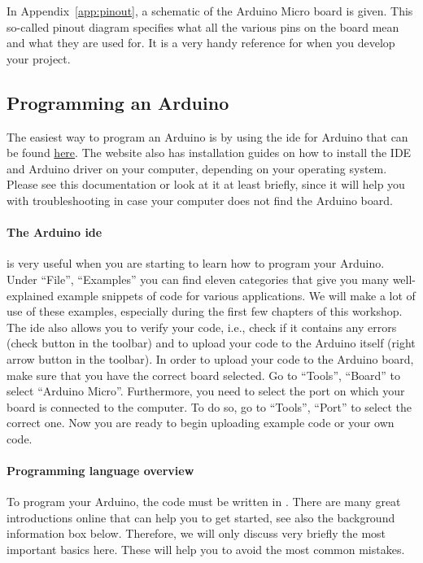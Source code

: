 In Appendix~\ref{app:pinout}, a schematic of the Arduino Micro board is given. This so-called pinout diagram specifies what all the various pins on the board mean and what they are used for. It is a very handy reference for when you develop your project.

\subsection{Programming an Arduino}

The easiest way to program an Arduino is by using the \ac{ide} for Arduino that can be found \href{https://www.arduino.cc/en/software}{here}. The website also has installation guides on how to install the IDE and Arduino driver on your computer, depending on your operating system. Please see this documentation or look at it at least briefly, since it will help you with troubleshooting in case your computer does not find the Arduino board.

\paragraph{The Arduino \ac{ide}} is very useful when you are starting to learn how to program your Arduino. Under ``File'', ``Examples'' you can find eleven categories that give you many well-explained example snippets of code for various applications. We will make a lot of use of these examples, especially during the first few chapters of this workshop. The \ac{ide} also allows you to verify your code, i.e., check if it contains any errors (check button in the toolbar) and to upload your code to the Arduino itself (right arrow button in the toolbar). In order to upload your code to the Arduino board, make sure that you have the correct board selected. Go to ``Tools'', ``Board'' to select ``Arduino Micro''. Furthermore, you need to select the port on which your board is connected to the computer. To do so, go to ``Tools'', ``Port'' to select the correct one. Now you are ready to begin uploading example code or your own code.

\paragraph{Programming language overview} To program your Arduino, the code must be written in \cpp. There are many great introductions online that can help you to get started, see also the background information box below. Therefore, we will only discuss very briefly the most important basics here. These will help you to avoid the most common mistakes.

